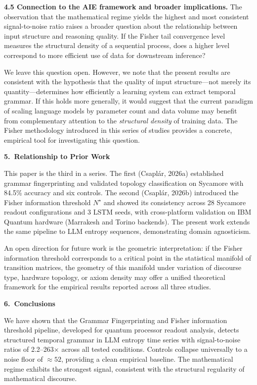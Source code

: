 \documentclass[11pt,a4paper]{article}
\begin{document}
\textbf{4.5 Connection to the AIE framework and broader implications.}
The observation that the mathematical regime yields the highest and most consistent signal-to-noise ratio raises a broader question about the relationship between input structure and reasoning quality. If the Fisher tail convergence level measures the structural density of a sequential process, does a higher level correspond to more efficient use of data for downstream inference?

We leave this question open. However, we note that the present results are consistent with the hypothesis that the quality of input structure---not merely its quantity---determines how efficiently a learning system can extract temporal grammar. If this holds more generally, it would suggest that the current paradigm of scaling language models by parameter count and data volume may benefit from complementary attention to the \emph{structural density} of training data. The Fisher methodology introduced in this series of studies provides a concrete, empirical tool for investigating this question.

\vspace{0.5em}
\textbf{5.\ Relationship to Prior Work}

This paper is the third in a series. The first (Csapl\'ar, 2026a) established grammar fingerprinting and validated topology classification on Sycamore with 84.5\% accuracy and six controls. The second (Csapl\'ar, 2026b) introduced the Fisher information threshold $N^\star$ and showed its consistency across 28 Sycamore readout configurations and 3 LSTM seeds, with cross-platform validation on IBM Quantum hardware (Marrakesh and Torino backends). The present work extends the same pipeline to LLM entropy sequences, demonstrating domain agnosticism.

An open direction for future work is the geometric interpretation: if the Fisher information threshold corresponds to a critical point in the statistical manifold of transition matrices, the geometry of this manifold under variation of discourse type, hardware topology, or axiom density may offer a unified theoretical framework for the empirical results reported across all three studies.

\vspace{0.5em}
\textbf{6.\ Conclusions}

We have shown that the Grammar Fingerprinting and Fisher information threshold pipeline, developed for quantum processor readout analysis, detects structured temporal grammar in LLM entropy time series with signal-to-noise ratios of 2.2--263$\times$ across all tested conditions. Controls collapse universally to a noise floor of $\approx52$, providing a clean empirical baseline. The mathematical regime exhibits the strongest signal, consistent with the structural regularity of mathematical discourse.
\end{document}
